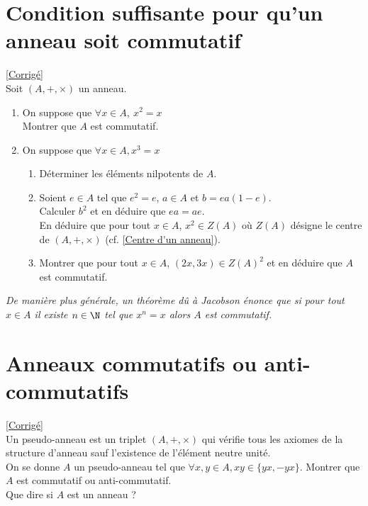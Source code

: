\documentclass[8pt]{book}
\begin{document}
	\section{Condition suffisante pour qu'un anneau soit commutatif }
	\label{Condition suffisante pour qu'un anneau soit commutatif}
	\textcolor{blue}{\hyperref[Condition suffisante pour qu'un anneau soit commutatif corrigé]{[Corrigé]}}\\
	Soit $(A,+,\times)$ un anneau.
	\begin{enumerate}
		\item On suppose que $\forall x\in A,\ x^2=x$\\
		Montrer que $A$ est commutatif.
		\item On suppose que $\forall x\in A, x^3=x$
		\begin{enumerate}[label=\alph*.]
			\item Déterminer les éléments nilpotents de $A$.
			\item Soient $e\in A$ tel que $e^2=e$, $a\in A$ et $b=ea(1-e)$.\\
			Calculer $b^2$ et en déduire que $ea=ae$.\\
			En déduire que pour tout $x\in A$, $x^2\in Z(A)$ où $Z(A)$ désigne le centre de $(A,+,\times)$ (cf. \ref{Centre d'un anneau}).
			\item Montrer que pour tout $x\in A$, $(2x,3x)\in Z(A)^2$ et en déduire que $A$ est commutatif.
		\end{enumerate}
	\end{enumerate}
	\textit{De manière plus générale, un théorème dû à Jacobson énonce que si pour tout $x\in A$ il existe $n\in \N$ tel que $x^n=x$ alors $A$ est commutatif.}
	
	\section{Anneaux commutatifs ou anti-commutatifs }
	\label{Anneaux commutatifs ou anti-commutatifs}
	\textcolor{blue}{\hyperref[Anneaux commutatifs ou anti-commutatifs corrigé]{[Corrigé]}}\\
	Un pseudo-anneau est un triplet $(A,+,\times)$ qui vérifie tous les axiomes de la structure d'anneau sauf l'existence de l'élément neutre unité.\\
	On se donne $A$ un pseudo-anneau tel que $\forall x,y\in A,xy\in \{yx,-yx\}$. Montrer que $A$ est commutatif ou anti-commutatif.\\
	Que dire si $A$ est un anneau ?
	
\end{document}
